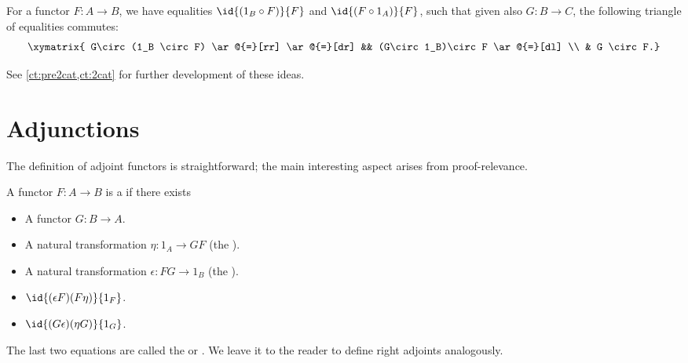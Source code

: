 \begin{lem}\label{ct:units}
  For a functor $F:A\to B$, we have equalities $\id{(1_B\circ F)}{F}$ and $\id{(F\circ 1_A)}{F}$, such that given also $G:B\to C$, the following triangle of equalities commutes:
  \[ \xymatrix{
    G\circ (1_B \circ F) \ar@{=}[rr] \ar@{=}[dr] &&
    (G\circ 1_B)\circ F \ar@{=}[dl] \\
    & G \circ F.}
  \]
\end{lem}

See \cref{ct:pre2cat,ct:2cat} for further development of these ideas.


\section{Adjunctions}
\label{sec:adjunctions}

The definition of adjoint functors is straightforward; the main interesting aspect arises from proof-relevance.

\begin{defn}\label{ct:adjoints}
  A functor $F:A\to B$ is a 
  if there exists
  \begin{itemize}
  \item A functor $G:B\to A$.
  \item A natural transformation $\eta:1_A \to GF$ (the ).
  \item A natural transformation $\epsilon:FG\to 1_B$ (the ).
  \item $\id{(\epsilon F)(F\eta)}{1_F}$.
  \item $\id{(G\epsilon)(\eta G)}{1_G}$.
  \end{itemize}
\end{defn}

The last two equations are called the  or .
We leave it to the reader to define right adjoints analogously.


